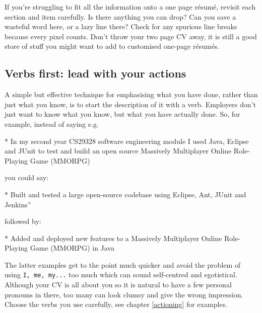 \documentclass[
]{book}
\newenvironment{Shaded}{\begin{snugshade}}{\end{snugshade}}
\newcommand{\NormalTok}[1]{#1}
\newcommand{\SpecialStringTok}[1]{\textcolor[rgb]{0.31,0.60,0.02}{#1}}
\begin{document}
If you're struggling to fit all the information onto a one page résumé, revisit each section and item carefully. Is there anything you can drop? Can you save a wasteful word here, or a lazy line there? Check for any spurious line breaks because every pixel counts. Don't throw your two page CV away, it is still a good store of stuff you might want to add to customised one-page résumés.

\hypertarget{verbsfirst}{%
\subsection{Verbs first: lead with your actions}\label{verbsfirst}}

A simple but effective technique for emphasising what you have done, rather than just what you know, is to start the description of it with a verb. Employers don't just want to know what you know, but what you have actually done. So, for example, instead of saying e.g.

\begin{Shaded}
\begin{Highlighting}[]
\SpecialStringTok{* }\NormalTok{In my second year CS29328 software engineering module I used Java, Eclipse and JUnit to test and build an open source Massively Multiplayer Online Role{-}Playing Game (MMORPG)}
\end{Highlighting}
\end{Shaded}

you could say:

\begin{Shaded}
\begin{Highlighting}[]
\SpecialStringTok{* }\NormalTok{Built and tested a large open{-}source codebase using Eclipse, Ant, JUnit and Jenkins”}
\end{Highlighting}
\end{Shaded}

followed by:

\begin{Shaded}
\begin{Highlighting}[]
\SpecialStringTok{* }\NormalTok{Added and deployed new features to a Massively Multiplayer Online Role{-}Playing Game (MMORPG) in Java}
\end{Highlighting}
\end{Shaded}

The latter examples get to the point much quicker and avoid the problem of using \texttt{I,\ me,\ my...} too much which can sound self-centred and egotistical. Although your CV is all about you so it is natural to have a few personal pronouns in there, too many can look clumsy and give the wrong impression. Choose the verbs you use carefully, see chapter \ref{actioning} for examples.
\end{document}
